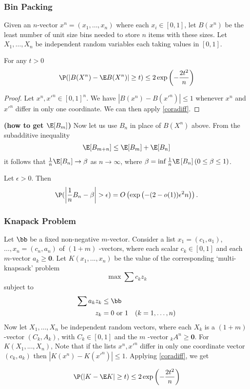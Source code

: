 \documentclass{article}
\newcommand{\bfs}[1]{\textbf{({#1})}}
\begin{document}
\subsubsection{Bin Packing}
Given an $n$-vector $x^n=(x_{1}, \ldots, x_{n})$ where each $x_{i} \in[0,1]$, let $B(x^n)$ be the least number of unit size bins needed to store $n$ items with these sizes. Let
$X _{1}, \ldots, X _{ n }$ be independent random variables each taking values in $[0,1] .$ 
\begin{lema}
For any $t>0$
$$
\P(| B(X^n) - \E B(X^n)| \geq t ) \leq 2 \exp \left(-\frac{2 t ^{2}}{ n} \right)
$$
\end{lema} 
\begin{proof}
Let $x^n, x'^n\in [0,1]^{ n }$. We have $\left| B (x^n)- B \left(x'^n\right)\right| \leq 1$ whenever $x^n$ and $x'^n$ differ in only one coordinate. We can then apply \cref{coradiff}.
\end{proof}

\begin{rema}{\bfs{how to get $\E[B_{m}]$}}
Now let us use $B _{ n }$ in place of $B(X^n)$ above. From the subadditive
inequality
\begin{align*}
    \E[B_{m+n}] \leq \E[B_{m}]+\E[B_{n}]
\end{align*}
it follows that $\frac{1}{ n } \E [ B _{ n }] \to \beta$ as $n \rightarrow \infty$, where $\beta=\inf \frac{1}{ n } \E \left[ B _{n}\right](0 \leq \beta \leq 1)$.
\end{rema}

\begin{lema}
Let $\epsilon>0$. Then
$$
\P (\left|\frac{1}{ n } B _{ n }-\beta\right|>\epsilon)=O\left(\exp \left(-(2-o(1)) \epsilon^{2} n \right)\right) .
$$
\end{lema} 
\subsubsection{Knapack Problem}
Let $\bb$ be a fixed non-negative $m$-vector. Consider a list $x_{1}=( c _{1}, {a}_1)$, $\ldots, x_{n}=(c_{n}, {a}_n)$ of $(1+m)$ -vectors, where each scalar $c_{k} \in[0,1]$ and each $m$-vector ${a}_k \geq \bm{0}$. Let $K (x_1,...,x_n)$ be the value of the corresponding `multi-knapsack' problem
$$
\max \sum c_{k} z_{k}
$$
subject to
\begin{align*}
   \sum {a}_{k} z_{k} &\leq \bb \\
z_{k}&=0 \text { or } 1 \quad(k=1, \ldots, n) 
\end{align*}
Now let ${X}_{1}, \ldots, {X}_{n}$ be independent random vectors, where each ${X}_{k}$ is a $(1+m)$ -vector $( C_{ k }, {A}_{k})$, with $C _{ k } \in[0,1]$ and the $m$ -vector ${}_{k}A^n \geq \bm{0}$. For $K(X_1,...,X_n)$, Note that if the lists $x^n, x'^n$ differ in
only one coordinate vector $(c_{k}, {a}_{k})$ then $\left|K(x^n)-K(x'^n)\right| \leq 1$. Applying \cref{coradiff}, we get 
\begin{lema}
$$
\P(| K - \E K| \geq t ) \leq 2 \exp \left(-\frac{2 t ^{2} }{ n} \right)
$$
\end{lema} 
\end{document}

